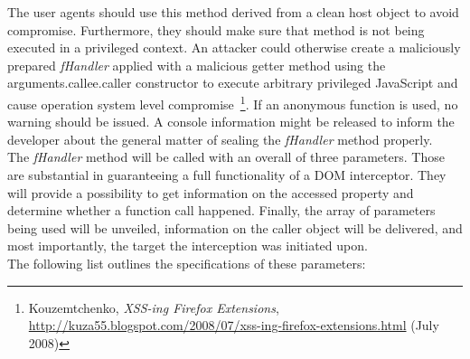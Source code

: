     The user agents should use this method derived from a clean host object to avoid compromise. Furthermore, they should make sure that method is not being executed in a privileged context. An attacker could otherwise create a maliciously prepared \textit{fHandler} applied with a malicious getter method using the arguments.callee.caller constructor to execute arbitrary privileged JavaScript and cause operation system level compromise~\footnote{Kouzemtchenko, \textit{XSS-ing Firefox Extensions}, \url{http://kuza55.blogspot.com/2008/07/xss-ing-firefox-extensions.html} (July 2008)}. If an anonymous function is used, no warning should be issued. A console information might be released to inform the developer about the general matter of sealing the \textit{fHandler} method properly.\\

    The \textit{fHandler} method will be called with an overall of three parameters. Those are substantial in guaranteeing a full functionality of a DOM interceptor. They will provide a possibility to get information on the accessed property and determine whether a function call happened. Finally, the array of parameters being used will be unveiled, information on the caller object will be delivered, and most importantly, the target the interception was initiated upon.\\
 
    The following list outlines the specifications of these parameters:\\

